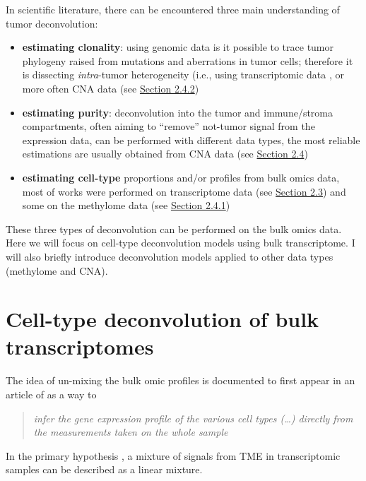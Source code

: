 \documentclass[12pt,]{book}
\providecommand{\tightlist}{%
  \setlength{\itemsep}{0pt}\setlength{\parskip}{0pt}}
\theoremstyle{definition}
\theoremstyle{definition}
\theoremstyle{definition}
\theoremstyle{remark}
\begin{document}
In scientific literature, there can be encountered three main
understanding of tumor deconvolution:

\begin{itemize}
\tightlist
\item
  \textbf{estimating clonality}: using genomic data is it possible to
  trace tumor phylogeny raised from mutations and aberrations in tumor
  cells; therefore it is dissecting \emph{intra}-tumor heterogeneity
  (i.e., using transcriptomic data \citep{Schwartz2010}, or more often
  CNA data (see \protect\hyperlink{otherDecon}{Section 2.4.2})
\item
  \textbf{estimating purity}: deconvolution into the tumor and
  immune/stroma compartments, often aiming to ``remove'' not-tumor
  signal from the expression data, can be performed with different data
  types, the most reliable estimations are usually obtained from CNA
  data (see \protect\hyperlink{otherDecon}{Section 2.4})
\item
  \textbf{estimating cell-type} proportions and/or profiles from bulk
  omics data, most of works were performed on transcriptome data (see
  \protect\hyperlink{cellTypeTrans}{Section 2.3}) and some on the
  methylome data (see \protect\hyperlink{otherDecon}{Section 2.4.1})
\end{itemize}

These three types of deconvolution can be performed on the bulk omics
data. Here we will focus on cell-type deconvolution models using bulk
transcriptome. I will also briefly introduce deconvolution models
applied to other data types (methylome and CNA).

\hypertarget{cellTypeTrans}{%
\section{Cell-type deconvolution of bulk
transcriptomes}\label{cellTypeTrans}}

The idea of un-mixing the bulk omic profiles is documented to first
appear in an article of \citet{Venet2001} as a way to

\begin{quote}
\emph{infer the gene expression profile of the various cell types
(\ldots{}) directly from the measurements taken on the whole sample}
\end{quote}

In the primary hypothesis \citep{Abbas2009}, a mixture of signals from
TME in transcriptomic samples can be described as a linear mixture.
\end{document}
